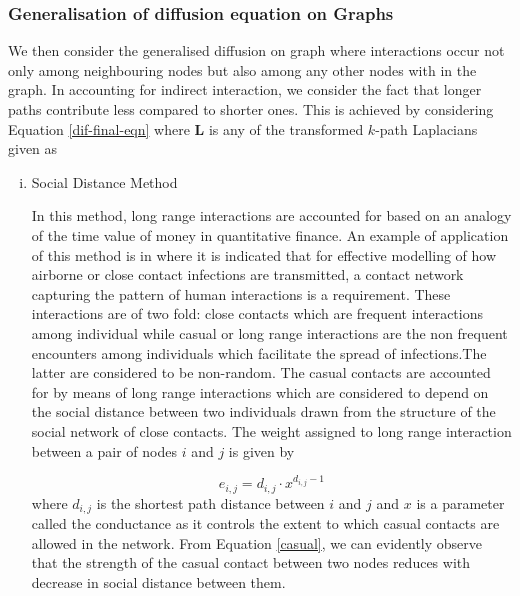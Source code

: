 \documentclass[10pt,a4paper]{article}
\begin{document}
    	    \subsubsection{Generalisation of diffusion equation on Graphs}
    	    We then consider the generalised diffusion on graph where interactions occur not only among neighbouring nodes but also among any other nodes with in the graph. In accounting for indirect interaction, we consider the fact that longer paths contribute less compared to shorter ones. This is achieved by considering Equation \ref{dif-final-eqn} where $\mathbf{L}$ is any of the transformed $k$-path Laplacians given as
    	    \begin{enumerate}[i)]
    	    	\item Social Distance Method
    	    	
    	    	In this method, long range interactions are accounted for based on an analogy of the time value of money in quantitative finance. An example of application of this method is in \citep{estrada2011epidemic} where it is indicated that for effective modelling of how airborne or close contact infections are transmitted, a contact network capturing the pattern of human interactions is a requirement. These interactions are of two fold: close contacts  which are frequent interactions among individual while casual or long range interactions are the non frequent encounters among individuals which facilitate the spread of infections.The latter are considered to be non-random.
    	    	The casual contacts are accounted for by means of long range interactions which are considered to depend on the social distance between two individuals drawn from the structure of the social network of close contacts.
    	    	 The weight assigned to long range interaction between a pair of nodes $i$ and $j$ is given by
    	    	
    	        \begin{equation}
    	        e_{i,j} = d_{i,j} \cdot  x^{d_{i,j}-1}
    	        \label{casual}
    	        \end{equation}
    	        where $d_{i,j}$ is the shortest path distance between $i$ and $j$ and $x$ is a parameter called the conductance as it controls the extent to which casual contacts are allowed in the network. From Equation \ref{casual}, we can evidently observe that the strength of the casual contact  between two nodes reduces with decrease in social distance between them.
    	        

\end{enumerate}
\end{document}
